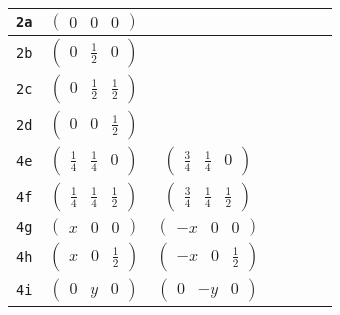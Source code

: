 \documentclass[fleqn,9pt,landscape]{jsarticle}
\begin{document}
\begin{center}
\begin{longtable}{ccccccc}
{\tt 2a} & $ \begin{pmatrix} 0 & 0 & 0 \end{pmatrix} $ & $  $ & $  $ & $  $ & $  $ & $  $ \\ \hline
{\tt 2b} & $ \begin{pmatrix} 0 & \frac{1}{2} & 0 \end{pmatrix} $ & $  $ & $  $ & $  $ & $  $ & $  $ \\ \hline
{\tt 2c} & $ \begin{pmatrix} 0 & \frac{1}{2} & \frac{1}{2} \end{pmatrix} $ & $  $ & $  $ & $  $ & $  $ & $  $ \\ \hline
{\tt 2d} & $ \begin{pmatrix} 0 & 0 & \frac{1}{2} \end{pmatrix} $ & $  $ & $  $ & $  $ & $  $ & $  $ \\ \hline
{\tt 4e} & $ \begin{pmatrix} \frac{1}{4} & \frac{1}{4} & 0 \end{pmatrix} $ & $ \begin{pmatrix} \frac{3}{4} & \frac{1}{4} & 0 \end{pmatrix} $ & $  $ & $  $ & $  $ & $  $ \\ \hline
{\tt 4f} & $ \begin{pmatrix} \frac{1}{4} & \frac{1}{4} & \frac{1}{2} \end{pmatrix} $ & $ \begin{pmatrix} \frac{3}{4} & \frac{1}{4} & \frac{1}{2} \end{pmatrix} $ & $  $ & $  $ & $  $ & $  $ \\ \hline
{\tt 4g} & $ \begin{pmatrix} x & 0 & 0 \end{pmatrix} $ & $ \begin{pmatrix} - x & 0 & 0 \end{pmatrix} $ & $  $ & $  $ & $  $ & $  $ \\ \hline
{\tt 4h} & $ \begin{pmatrix} x & 0 & \frac{1}{2} \end{pmatrix} $ & $ \begin{pmatrix} - x & 0 & \frac{1}{2} \end{pmatrix} $ & $  $ & $  $ & $  $ & $  $ \\ \hline
{\tt 4i} & $ \begin{pmatrix} 0 & y & 0 \end{pmatrix} $ & $ \begin{pmatrix} 0 & - y & 0 \end{pmatrix} $ & $  $ & $  $ & $  $ & $  $ \\ \hline

\end{longtable}
\end{center}
\end{document}
